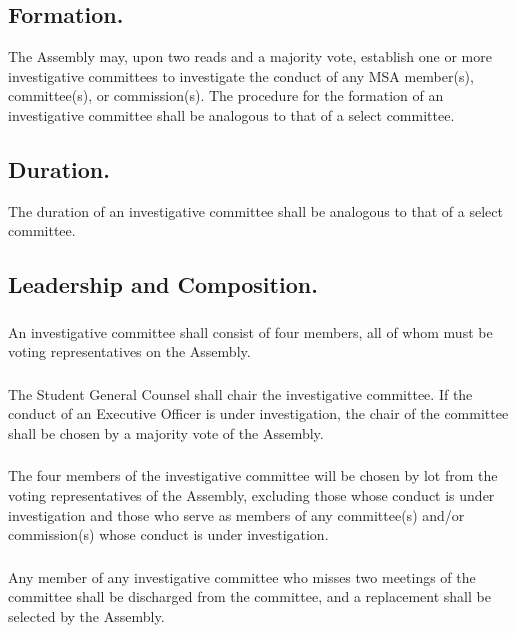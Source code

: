 \subsection{Formation.}
The Assembly may, upon two reads and a majority vote, establish one or more investigative committees to investigate the conduct of any MSA member(s), committee(s), or commission(s).  The procedure for the formation of an investigative committee shall be analogous to that of a select committee.

\subsection{Duration.}
The duration of an investigative committee shall be analogous to that of a select committee.

\subsection{Leadership and Composition.}

\subsubsection{}
An investigative committee shall consist of four members, all of whom must be voting representatives on the Assembly.  

\subsubsection{}
The Student General Counsel shall chair the investigative committee.  If the conduct of an Executive Officer is under investigation, the chair of the committee shall be chosen by a majority vote of the Assembly.

\subsubsection{}
The four members of the investigative committee will be chosen by lot from the voting representatives of the Assembly, excluding those whose conduct is under investigation and those who serve as members of any committee(s) and/or commission(s) whose conduct is under investigation.

\subsubsection{}
Any member of any investigative committee who misses two meetings of the committee shall be discharged from the committee, and a replacement shall be selected by the Assembly.


